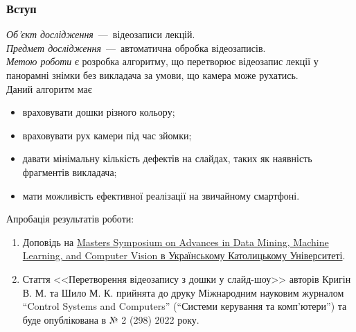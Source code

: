 \begin{frame}
    \frametitle{Вступ}
    \textit{Об'єкт дослідження}~---~відеозаписи лекцій. \\
    \textit{Предмет дослідження}~---~автоматична обробка відеозаписів. \\
    \textit{Метою роботи} є розробка алгоритму, що перетворює
    відеозапис лекції у панорамні знімки без викладача
    за умови, що камера може рухатись. \\
    Даний алгоритм має
    \begin{itemize}
        \item враховувати дошки різного кольору;
        \item враховувати рух камери під час зйомки;
        \item давати мінімальну кількість дефектів на слайдах,
              таких як наявність фрагментів викладача;
        \item мати можливість ефективної реалізації на звичайному смартфоні.
    \end{itemize}
    Апробація результатів роботи:
    \begin{enumerate}
        \item Доповідь на
              \href{https://s3.eu-central-1.amazonaws.com/ucu.edu.ua/wp-content/uploads/sites/8/2021/04/Creating-Slides-from-Video-Lecture.pdf}{Masters Symposium on Advances in Data Mining,
                  Machine Learning, and Computer Vision в Українському Католицькому Університеті}.
        \item Стаття <<Перетворення відеозапису з дошки у слайд-шоу>> авторів
              Кригін В. М. та Шило М. К. прийнята до друку
              Міжнародним науковим журналом “Control Systems and Computers”
              (“Системи керування та комп'ютери”) та буде опублікована в № 2 (298) 2022 року.
    \end{enumerate}
\end{frame}
